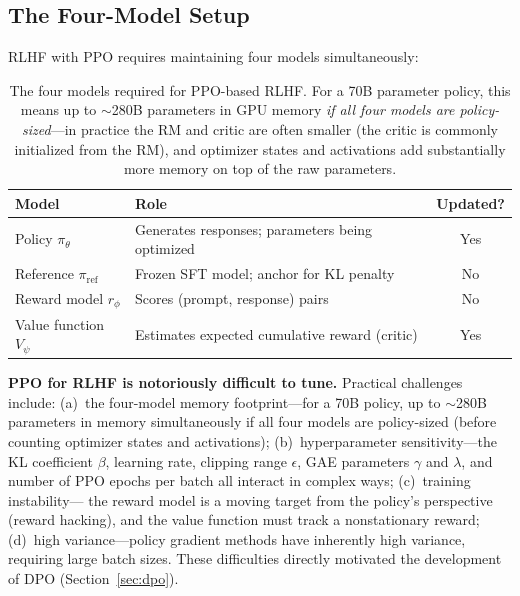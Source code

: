 \subsection{The Four-Model Setup}

RLHF with PPO requires maintaining four models simultaneously:

\begin{table}[H]
\centering
\begin{tabularx}{\textwidth}{lXc}
\toprule
\textbf{Model} & \textbf{Role} & \textbf{Updated?} \\
\midrule
Policy $\pi_\theta$ & Generates responses; parameters being optimized & Yes \\
Reference $\pi_{\text{ref}}$ & Frozen SFT model; anchor for KL penalty & No \\
Reward model $r_\phi$ & Scores (prompt, response) pairs & No \\
Value function $V_\psi$ & Estimates expected cumulative reward (critic) & Yes \\
\bottomrule
\end{tabularx}
\caption{The four models required for PPO-based RLHF.  For a 70B parameter
policy, this means up to $\sim$280B parameters in GPU memory \emph{if all
four models are policy-sized}---in practice the RM and critic are often
smaller (the critic is commonly initialized from the RM), and optimizer
states and activations add substantially more memory on top of the raw
parameters.}
\label{tab:four_models}
\end{table}

\begin{warningbox}
\textbf{PPO for RLHF is notoriously difficult to tune.}  Practical
challenges include: (a)~the four-model memory footprint---for a 70B policy,
up to $\sim$280B parameters in memory simultaneously if all four models are
policy-sized (before counting optimizer states and activations);
(b)~hyperparameter
sensitivity---the KL coefficient $\beta$, learning rate, clipping range
$\epsilon$, GAE parameters $\gamma$ and $\lambda$, and number of PPO
epochs per batch all interact in complex ways; (c)~training instability---
the reward model is a moving target from the policy's perspective (reward
hacking), and the value function must track a nonstationary reward;
(d)~high variance---policy gradient methods have inherently high variance,
requiring large batch sizes.  These difficulties directly motivated the
development of DPO (Section~\ref{sec:dpo}).
\end{warningbox}



